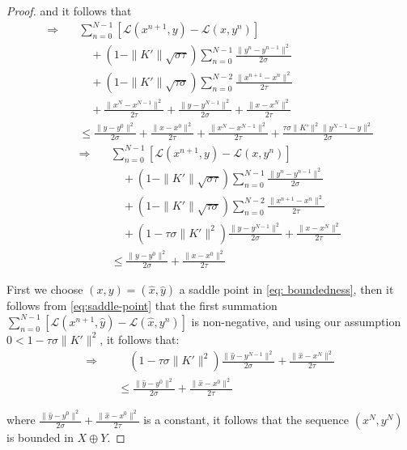 \documentclass[twoside,12pt,openright]{report}  %
\begin{document}
\begin{proof}
and it follows that
\[
\begin{aligned}
\Rightarrow\quad
&\sum_{n=0}^{N-1} \left[ \mathcal{L}(x^{n+1},y)- \mathcal{L}(x,y^n) \right] \\
&\quad + (1 - \|K'\|\sqrt{\sigma\tau}) \sum_{n=0}^{N-1} \frac{\|y^n - y^{n-1}\|^2}{2\sigma} \\
&\quad + (1 - \|K'\|\sqrt{\tau\sigma}) \sum_{n=0}^{N-2} \frac{\|x^{n+1} - x^n\|^2}{2\tau} \\
&\quad + \frac{\|x^N - x^{N-1}\|^2}{2\tau} + \frac{\|y - y^{N-1}\|^2}{2\sigma} + \frac{\|x - x^N\|^2}{2\tau} \\
&\leq \frac{\|y - y^{0}\|^2}{2\sigma} + \frac{\|x - x^0\|^2}{2\tau} + \frac{\|x^N - x^{N-1}\|^2}{2\tau} + \frac{\tau\sigma\|K'\|^2\|y^{N-1} - y\|^2}{2\sigma}
\end{aligned}
\]
%
\begin{equation}
\label{eq: boundedness}
\begin{aligned}
\Rightarrow\quad
&\sum_{n=0}^{N-1} \left[ \mathcal{L}(x^{n+1},y)- \mathcal{L}(x,y^n) \right] \\
&\quad + (1 - \|K'\|\sqrt{\sigma\tau}) \sum_{n=0}^{N-1} \frac{\|y^n - y^{n-1}\|^2}{2\sigma} \\
&\quad + (1 - \|K'\|\sqrt{\tau\sigma}) \sum_{n=0}^{N-2} \frac{\|x^{n+1} - x^n\|^2}{2\tau} \\
&\quad + (1 - \tau\sigma\|K'\|^2) \frac{\|y - y^{N-1}\|^2}{2\sigma} + \frac{\|x - x^N\|^2}{2\tau} \\
&\leq \frac{\|y - y^{0}\|^2}{2\sigma} + \frac{\|x - x^0\|^2}{2\tau}
\end{aligned}
\end{equation}


First we choose \((x,y) = (\hat{x},\hat{y})\) a saddle point in \eqref{eq: boundedness}, then it follows from \eqref{eq:saddle-point} that the first summation \(\sum_{n=0}^{N-1} \left[ \mathcal{L}(x^{n+1},\hat{y})- \mathcal{L}(\hat{x},y^n) \right]\) is non-negative, and using our assumption \(0 <1-\tau\sigma\|K'\|^2\), it follows that:
\[
\begin{aligned}
\Rightarrow\quad
&\quad  (1 - \tau\sigma\|K'\|^2) \frac{\|\hat{y} - y^{N-1}\|^2}{2\sigma} + \frac{\|\hat{x} - x^N\|^2}{2\tau} \\
&\leq \frac{\|\hat{y} - y^{0}\|^2}{2\sigma} + \frac{\|\hat{x} - x^0\|^2}{2\tau}
\end{aligned}
\]

where \(\frac{\|\hat{y} - y^{0}\|^2}{2\sigma} + \frac{\|\hat{x} - x^0\|^2}{2\tau}\) is a constant, it follows that the sequence \((x^N,y^N)\) is bounded in \(X \oplus Y\).


\end{proof}
\end{document}
